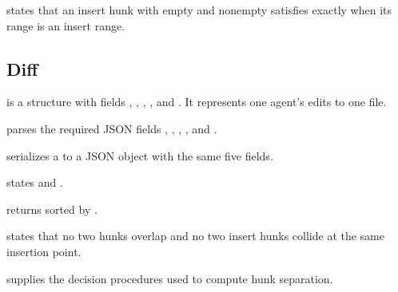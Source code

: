 \begin{theorem}
 states that an insert hunk with empty
 and nonempty  satisfies 
exactly when its range is an insert range.
\end{theorem}

\subsection{Diff}

\begin{definition}[Diff]
\code{[Diff]} is a structure with fields ,
, , ,
and . It represents one agent's edits to one file.
\end{definition}

\begin{definition}
 parses the required JSON fields ,
, , , and .
\end{definition}

\begin{definition}
 serializes a  to a JSON object with the same
five fields.
\end{definition}

\begin{definition}
 states  and
.
\end{definition}

\begin{definition}
 returns  sorted by
.
\end{definition}

\begin{definition}
 states that no two hunks overlap and no two
insert hunks collide at the same insertion point.
\end{definition}

\begin{definition}
 supplies the decision procedures used
to compute hunk separation.
\end{definition}

